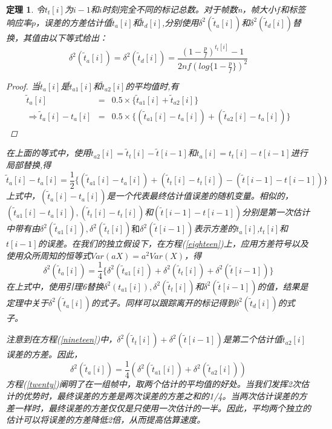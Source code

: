 \documentclass[UTF8]{ctexart}
\newtheorem{theorem}{定理}
\newtheorem*{proof}{证明}
\begin{document}
	\begin{theorem}
		令$t_t[i]$为$i-1$和$i$时刻完全不同的标记总数。对于帧数n，帧大小$f$和标签响应率$p$，误差的方差估计值$\widetilde{t}_a[i]$和$\widetilde{t}_d[i]$,分别使用$\delta^2(\widetilde{t}_a[i])$和$\delta^2(\widetilde{t}_d[i])$替换，其值由以下等式给出：
		\begin{equation}\label{seventeen}
		\delta^2(\widetilde{t}_a[i])=\delta^2(\widetilde{t}_d[i])=\frac{(1-\frac{p}{f})^{t_t[i]}-1}{2nf(log\{1-\frac{p}{f}\})^2}
		\end{equation}
		\begin{proof}
			当$\widetilde{t}_a[i]$是$\widetilde{t}_{a1}[i]$和$\widetilde{t}_{a2}[i]$的平均值时,有
			\begin{eqnarray*}
				\widetilde{t}_a[i]&=&0.5\times \{\widetilde{t}_{a1}[i]+\widetilde{t}_{a2}[i]\}\\
				\Rightarrow\widetilde{t}_a[i]-t_a[i]&=&0.5\times \{(\widetilde{t}_{a1}[i]-t_a[i])+(\widetilde{t}_{a2}[i]-t_a[i])\}
			\end{eqnarray*}
		\end{proof}
		在上面的等式中，使用$\widetilde{t}_{a2}[i]=\widetilde{t}_t[i]-\widetilde{t}[i-1]$和$t_a[i]=t_t[i]-t[i-1]$进行局部替换,得
		\begin{equation}\label{eighteen}
		\widetilde{t}_a[i]-t_a[i]=\frac{1}{2}\{(\widetilde{t}_{a1}[i]-t_a[i])+(\widetilde{t}_t[i]-t_t[i])-(\widetilde{t}[i-1]-t[i-1])\}
		\end{equation}
		上式中，$(\widetilde{t}_a[i]-t_a[i])$是一个代表最终估计值误差的随机变量。相似的，$(\widetilde{t}_{a1}[i]-t_a[i]),(\widetilde{t}_t[i]-t_t[i])$和$(\widetilde{t}[i-1]-t[i-1])$分别是第一次估计中带有由$\delta^2(\widetilde{t}_{a1}[i]),\delta^2(\widetilde{t}_t[i])和\delta^2(\widetilde{t}[i-1])$表示方差的$t_a[i]$,$t_t[i]$和$t[i-1]$的误差。在我们的独立假设下，在方程(\ref{eighteen})上，应用方差符号以及使用众所周知的恒等式$Var(aX)=a^2Var(X)$，得
		\begin{equation}\label{nineteen}
		\delta^2(\widetilde{t}_a[i])=\frac{1}{4}\{\delta^2(\widetilde{t}_{a1}[i])+\delta^2(\widetilde{t}_t[i])+\delta^2(\widetilde{t}[i-1])\}
		\end{equation}
		在上式中，使用引理6替换$\delta^2(t_{a1}[i]),\delta^2(\widetilde{t}_t[i])$和$\delta^2(\widetilde{t}[i-1])$的值，结果是定理中关于$\delta^2(\widetilde{t}_a[i])$的式子。同样可以跟踪离开的标记得到$\delta^2(\widetilde{t}_d[i])$的式子。
		
		注意到在方程(\ref{nineteen})中，$\delta^2(\widetilde{t}_t[i])+\delta^2(\widetilde{t}[i-1])$是第二个估计值$\widetilde{t}_{a2}[i]$误差的方差。因此，
		\begin{equation}\label{twenty}
		\delta^2(\widetilde{t}_a[i])=\frac{1}{4}(\delta^2(\widetilde{t}_{a1}[i])+\delta^2(\widetilde{t}_{a2}[i]))
		\end{equation}
		方程(\ref{twenty})阐明了在一组帧中，取两个估计的平均值的好处。当我们发挥2次估计的优势时，最终误差的方差是两次误差的方差之和的1/4。当两次估计误差的方差一样时，最终误差的方差仅仅是只使用一次估计的一半。因此，平均两个独立的估计可以将误差的方差降低2倍，从而提高估算速度。
	\end{theorem}
	
\end{document}
